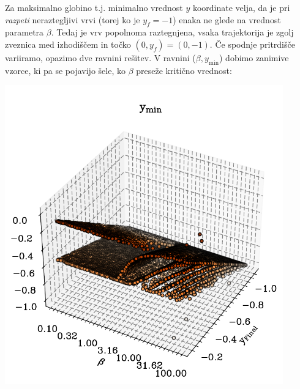 Za maksimalno globino t.j. minimalno vrednost $y$ koordinate velja, da je pri \emph{razpeti} neraztegljivi vrvi (torej ko je $y_f=-1$) enaka ne glede na vrednost parametra $\beta$. Tedaj je vrv popolnoma raztegnjena, vsaka trajektorija je zgolj zveznica med izhodiščem in točko $(0,y_f) = (0, -1)$. Če spodnje pritrdišče variiramo, opazimo dve ravnini rešitev. V ravnini ($\beta, y_\mathrm{min}$) dobimo zanimive vzorce, ki pa se pojavijo šele, ko $\beta$ preseže kritično vrednost:
\begin{center}
     \includegraphics[width=0.9\textwidth]{../images/2024-1-fazni_portret_ymin.pdf}
\end{center}


